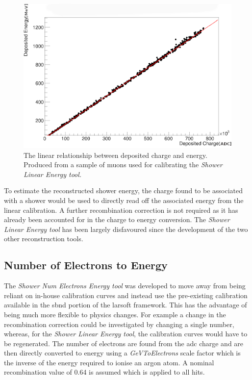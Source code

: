 \begin{figure}[h]
    \centering
    \includegraphics[width = \largefigwidth]{figures-chap4/linear_energy_lookup_curve1.png}
    \caption{The linear relationship between deposited charge and energy. Produced from a sample of muons used for calibrating the \textit{Shower Linear Energy tool.}}
    \label{fig:linear lookup curve}
\end{figure}

To estimate the reconstructed shower energy, the charge found to be associated with a shower would be used to directly read off the associated energy from the linear calibration. A further recombination correction is not required as it has already been accounted for in the charge to energy conversion. The \textit{Shower Linear Energy tool} has been largely disfavoured since the development of the two other reconstruction tools. 

\subsection{Number of Electrons to Energy}\label{subchap:kGeVToElectrons}
The \textit{Shower Num Electrons Energy tool} was developed to move away from being reliant on in-house calibration curves and instead use the pre-existing calibration available in the \Gls{sbnd} portion of the \Gls{larsoft} framework. This has the advantage of being much more flexible to physics changes. For example a change in the recombination correction could be investigated by changing a single number, whereas, for the \textit{Shower Linear Energy tool}, the calibration curves would have to be regenerated. The number of electrons are found from the \gls{adc} charge and are then directly converted to energy using a \textit{GeVToElectrons} scale factor which is the inverse of the energy required to ionise an argon atom. A nominal recombination value of 0.64 is assumed which is applied to all hits.

